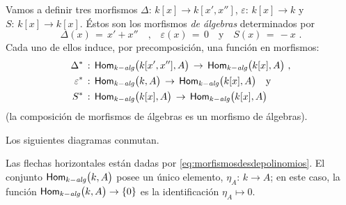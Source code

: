 Vamos a definir tres morfismos $\Delta:\,k[x]\rightarrow k[x',x'']$,
$\varepsilon:\,k[x]\rightarrow k$ y $S:\,k[x]\rightarrow k[x]$. \'{E}stos son
los morfismos \emph{de \'{a}lgebras} determinados por
\begin{equation}
	\label{eq:rectafin}
	\Delta(x)\,=\,x'+x'' \quad\text{,}\quad \varepsilon(x)\,=\,0
		\quad\text{y}\quad S(x)\,=\,-x
	\text{ .}
\end{equation}
%
Cada uno de ellos induce, por precomposici\'{o}n, una funci\'{o}n en morfismos:
\begin{align*}
	{\Delta}^{*} & \,:\,\mathsf{Hom}_{k-\mathit{alg}}\big(k[x',x''],A\big)\,\rightarrow\,
		\mathsf{Hom}_{k-\mathit{alg}}\big(k[x],A\big) \text{ ,} \\
	{\varepsilon}^{*} & \,:\,\mathsf{Hom}_{k-\mathit{alg}}\big(k,A\big)\,\rightarrow\,
		\mathsf{Hom}_{k-\mathit{alg}}\big(k[x],A\big) \quad\text{y} \\
	{S}^{*} & \,:\,\mathsf{Hom}_{k-\mathit{alg}}\big(k[x],A\big)\,\rightarrow\,
		\mathsf{Hom}_{k-\mathit{alg}}\big(k[x],A\big)
\end{align*}
%
(la composici\'{o}n de morfismos de \'{a}lgebras es un morfismo de
\'{a}lgebras).

\begin{propoRectaAfin}\label{propo:rectaafin}
	Los siguientes diagramas conmutan.
	\begin{center}
	\end{center}
\end{propoRectaAfin}
Las flechas horizontales est\'{a}n dadas por
\eqref{eq:morfismosdesdepolinomios}. El conjunto $\mathsf{Hom}_{k-\mathit{alg}}\big(k,A\big)$ posee
un \'{u}nico elemento, $\eta_A:\,k\rightarrow A$; en este caso, la funci\'{o}n
$\mathsf{Hom}_{k-\mathit{alg}}\big(k,A\big)\rightarrow \{0\}$ es la identificaci\'{o}n
$\eta_A\mapsto 0$.

